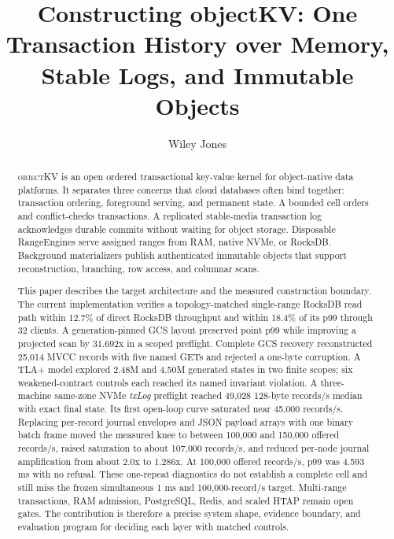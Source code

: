 \documentclass[sigconf,nonacm]{acmart}
\newcommand{\okv}{\textsc{objectKV}}
\newcommand{\txlog}{\textit{txLog}}
\begin{document}
\title{Constructing objectKV: One Transaction History over Memory, Stable Logs, and Immutable Objects}

\author{Wiley Jones}

\begin{abstract}
\okv{} is an open ordered transactional key-value kernel for object-native
data platforms. It separates three concerns that cloud databases often bind
together: transaction ordering, foreground serving, and permanent state. A
bounded cell orders and conflict-checks transactions. A replicated stable-media
transaction log acknowledges durable commits without waiting for object
storage. Disposable RangeEngines serve assigned ranges from RAM, native NVMe,
or RocksDB. Background materializers publish authenticated immutable objects
that support reconstruction, branching, row access, and columnar scans.

This paper describes the target architecture and the measured construction
boundary. The current implementation verifies a topology-matched single-range
RocksDB read path within 12.7\% of direct RocksDB throughput and within 18.4\%
of its p99 through 32 clients. A generation-pinned GCS layout preserved point
p99 while improving a projected scan by 31.692x in a scoped preflight. Complete
GCS recovery reconstructed 25,014 MVCC records with five named GETs and rejected
a one-byte corruption. A TLA+ model explored 2.48M and 4.50M generated states in
two finite scopes; six weakened-contract controls each reached its named
invariant violation. A three-machine same-zone NVMe \txlog{} preflight reached
49,028 128-byte records/s median with exact final state. Its first open-loop
curve saturated near 45,000 records/s. Replacing per-record journal envelopes
and JSON payload arrays with one binary batch frame moved the measured knee to
between 100,000 and 150,000 offered records/s, raised saturation to about
107,000 records/s, and reduced per-node journal amplification from about 2.0x
to 1.286x. At 100,000 offered records/s, p99 was 4.593 ms with no refusal.
These one-repeat diagnostics do not establish a complete cell and still miss
the frozen simultaneous 1 ms and 100,000-record/s target. Multi-range
transactions, RAM admission, PostgreSQL, Redis, and scaled HTAP remain open
gates. The contribution is therefore a precise system shape, evidence boundary,
and evaluation program for deciding each layer with matched controls.
\end{abstract}
\end{document}
